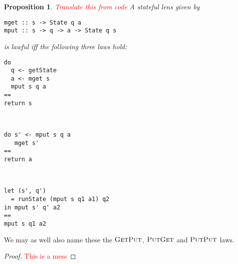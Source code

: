 \documentclass[11pt,letterpaper]{article}
\theoremstyle{plain}
\newtheorem{proposition}[theorem]{Proposition}
\theoremstyle{definition}
\newcommand{\C}{\mathscr{C}}
\newcommand{\homC}{\underline{\C}}
\newcommand{\fget}{\textsc{Get}}
\newcommand{\fput}{\textsc{Put}}
\newcommand{\todo}[1]{\textcolor{red}{\small #1}}
\begin{document}
\begin{proposition}
\todo{Translate this from code}
A stateful lens given by
\begin{verbatim}
mget :: s -> State q a
mput :: s -> q -> a -> State q s
\end{verbatim}
is lawful iff the following three laws hold: \\
\begin{minipage}{\textwidth}
\begin{multicols}{3}
\begin{verbatim}
do
  q <- getState
  a <- mget s
  mput s q a
==
return s
\end{verbatim}
~\columnbreak
\begin{verbatim}
do s' <- mput s q a
   mget s'
==
return a
\end{verbatim}
~\columnbreak
\begin{verbatim}
let (s', q') 
  = runState (mput s q1 a1) q2
in mput s' q' a2
==
mput s q1 a2
\end{verbatim}
\end{multicols}
\end{minipage}
\end{proposition}
We may as well also name these the $\fget\fput$, $\fput\fget$ and $\fput\fput$ laws.
\begin{proof}
\todo{This is a mess}
\end{proof}
\end{document}
